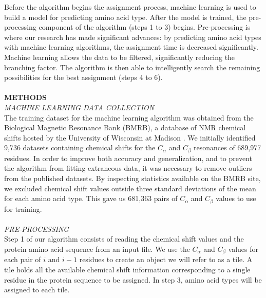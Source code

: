 \documentclass{article}
\begin{document}
Before the algorithm begins the assignment process, machine learning is used to build a model for predicting amino acid type. After the model is trained, the pre-processing component of the algorithm (steps 1 to 3) begins. Pre-processing is where our research has made significant advances: by predicting amino acid types with machine learning algorithms, the assignment time is decreased significantly. Machine learning allows the data to be filtered, significantly reducing the branching factor. The algorithm is then able to intelligently search the remaining possibilities for the best assignment (steps 4 to 6). 
\\\\
\noindent\textbf{METHODS}\\
\noindent\textit{MACHINE LEARNING DATA COLLECTION}\\
The training dataset for the machine learning algorithm was obtained from the Biological Magnetic Resonance Bank (BMRB), a database of NMR chemical shifts hosted by the University of Wisconsin at Madison \cite{biomagresbank}. We initially identified 9,736 datasets containing chemical shifts for the $C_{\alpha}$ and $C_{\beta}$ resonances of 689,977 residues. In order to improve both accuracy and generalization, and to prevent the algorithm from fitting extraneous data, it was necessary to remove outliers from the published datasets. By inspecting statistics available on the BMRB site, we excluded chemical shift values outside three standard deviations of the mean for each amino acid type. This gave us 681,363 pairs of $C_{\alpha}$ and $C_{\beta}$ values to use for training.
\\\\
\noindent\textit{PRE-PROCESSING}\\
Step 1 of our algorithm consists of reading the chemical shift values and the protein amino acid sequence from an input file. We use the $C_{\alpha}$ and $C_{\beta}$ values for each pair of $i$ and $i-1$ residues to create an object we will refer to as a tile. A tile holds all the available chemical shift information corresponding to a single residue in the protein sequence to be assigned. In step 3, amino acid types will be assigned to each tile.
\end{document}
